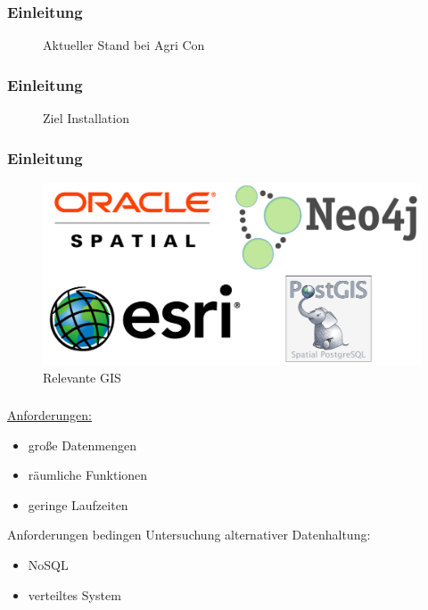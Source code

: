 \documentclass{beamer}
\begin{document}
\begin{frame}\frametitle{Einleitung}
\begin{figure}
\centering

\caption{Aktueller Stand bei Agri Con}
\end{figure}
\end{frame}

\begin{frame}\frametitle{Einleitung}
\begin{figure}[h!]
\centering
\resizebox{.92\linewidth}{!}{}
\caption{Ziel Installation}
\end{figure}
\end{frame}

\begin{frame}\frametitle{Einleitung}
\begin{figure}
\centering
\includegraphics[width=1\hsize]{Logos.png}
\caption{Relevante GIS}
\end{figure}
\end{frame}

\begin{frame}\frametitle{}
\underline{Anforderungen:}\\
\begin{itemize}
\item große Datenmengen
\item räumliche Funktionen
\item geringe Laufzeiten
\end{itemize}
\vspace{\baselineskip}
\vspace{\baselineskip}
Anforderungen bedingen Untersuchung alternativer Datenhaltung:\\
\begin{itemize}
\item NoSQL
\item verteiltes System
\end{itemize}
\end{frame}
\end{document}
